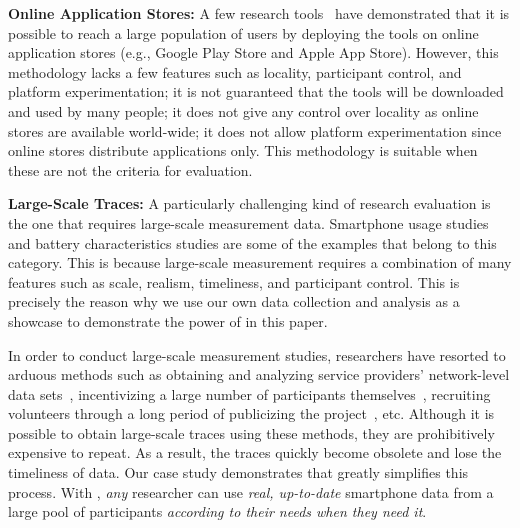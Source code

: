 {\bf Online Application Stores:} A few research tools~\cite{huang:mobisys:2010,
zhang:codes:2010} have demonstrated that it is possible to reach a large
population of users by deploying the tools on online application stores (e.g.,
Google Play Store and Apple App Store). However, this methodology lacks a few
features such as locality, participant control, and platform experimentation; it
is not guaranteed that the tools will be downloaded and used by many people; it
does not give any control over locality as online stores are available
world-wide; it does not allow platform experimentation since online stores
distribute applications only. This methodology is suitable when these are not
the criteria for evaluation.

{\bf Large-Scale Traces:} A particularly challenging kind of research evaluation
is the one that requires large-scale measurement data. Smartphone usage studies
and battery characteristics studies are some of the examples that belong to this
category. This is because large-scale measurement requires a combination of many
features such as scale, realism, timeliness, and participant control. This is
precisely the reason why we use our own data collection and analysis as a
showcase to demonstrate the power of \PhoneLab{} in this paper.

In order to conduct large-scale measurement studies, researchers have resorted
to arduous methods such as obtaining and analyzing service providers'
network-level data sets~\cite{xu:imc:2011, trestian:imc:2009,
trestian:ton:2012}, incentivizing a large number of participants
themselves~\cite{falaki:mobisys:2010}, recruiting volunteers through a long
period of publicizing the project~\cite{shye:micro:2009}, etc. Although it is
possible to obtain large-scale traces using these methods, they are
prohibitively expensive to repeat. As a result, the traces quickly become
obsolete and lose the timeliness of data. Our case study demonstrates that
\PhoneLab{} greatly simplifies this process. With \PhoneLab{}, {\it any}
researcher can use {\it real, up-to-date} smartphone data from a large pool of
participants {\it according to their needs when they need it}.
